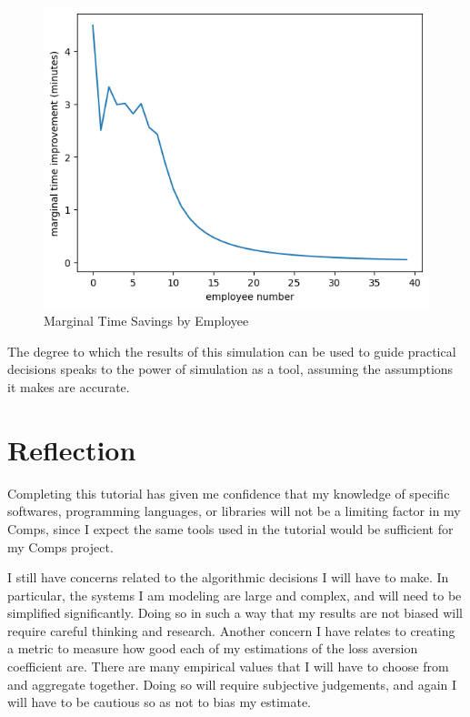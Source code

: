 \documentclass[10pt,twocolumn]{article}
\begin{document}
\begin{figure}[H]
    \centering
    \includegraphics[width=0.9\linewidth]{marginal.png}
    \caption{Marginal Time Savings by Employee}
    \label{fig:enter-label}
\end{figure}

The degree to which the results of this simulation can be used to guide practical decisions speaks to the power of simulation as a tool, assuming the assumptions it makes are accurate. 

\section{Reflection}

Completing this tutorial has given me confidence that my knowledge of specific softwares, programming languages, or libraries will not be a limiting factor in my Comps, since I expect the same tools used in the tutorial would be sufficient for my Comps project. 

I still have concerns related to the algorithmic decisions I will have to make. In particular, the systems I am modeling are large and complex, and will need to be simplified significantly. Doing so in such a way that my results are not biased will require careful thinking and research. Another concern I have relates to creating a metric to measure how good each of my estimations of the loss aversion coefficient are. There are many empirical values that I will have to choose from and aggregate together. Doing so will require subjective judgements, and again I will have to be cautious so as not to bias my estimate.
\end{document}
